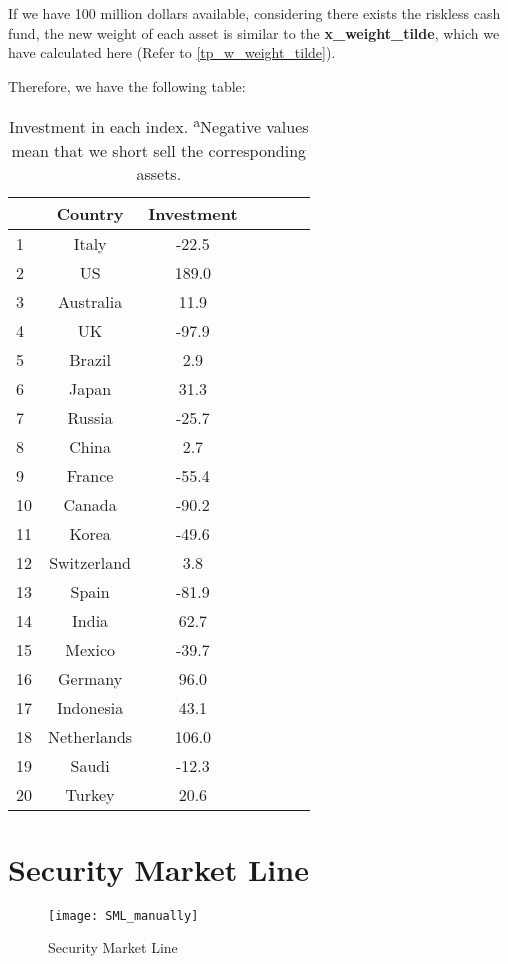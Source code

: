 \documentclass[
]{article}
\begin{document}
If we have 100 million dollars available, considering there exists the
riskless cash fund, the new weight of each asset is similar to the
\textbf{x\_weight\_tilde}, which we have calculated here (Refer to
\ref{tp_w_weight_tilde}).

Therefore, we have the following table:

\begin{table}[!htb]
\centering
{\begin{tabular}{lcccccc} 
  \hline
 & Country & Investment \\ 
  \hline
1 & Italy & -22.5 \\ 
  2 & US & 189.0 \\ 
  3 & Australia & 11.9 \\ 
  4 & UK & -97.9 \\ 
  5 & Brazil & 2.9 \\ 
  6 & Japan & 31.3 \\ 
  7 & Russia & -25.7 \\ 
  8 & China & 2.7 \\ 
  9 & France & -55.4 \\ 
  10 & Canada & -90.2 \\ 
  11 & Korea & -49.6 \\ 
  12 & Switzerland & 3.8 \\ 
  13 & Spain & -81.9 \\ 
  14 & India & 62.7 \\ 
  15 & Mexico & -39.7 \\ 
  16 & Germany & 96.0 \\ 
  17 & Indonesia & 43.1 \\ 
  18 & Netherlands & 106.0 \\ 
  19 & Saudi & -12.3 \\ 
  20 & Turkey & 20.6 \\ 
   \hline
\end{tabular}
\caption{Investment in each index. \textsuperscript{a}Negative values mean that we short sell the corresponding assets.}}
\label{investment_100.csv}
\end{table}

\hypertarget{security-market-line}{%
\section{Security Market Line}\label{security-market-line}}

\begin{figure}[!htb]
\begin{center}
\texttt{[image: SML\_manually]}
\end{center}
\caption{Security Market Line}\label{SML}
\end{figure}
\end{document}
